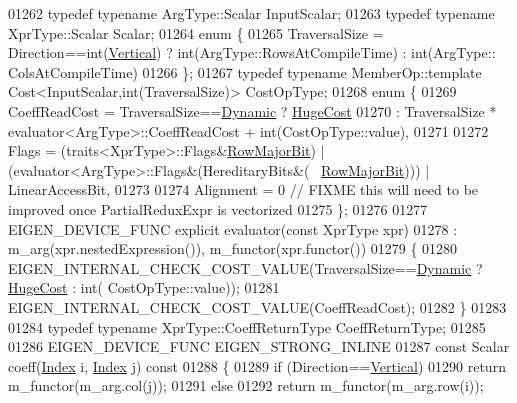 \begin{DoxyCode}
01262   \textcolor{keyword}{typedef} \textcolor{keyword}{typename} ArgType::Scalar InputScalar;
01263   \textcolor{keyword}{typedef} \textcolor{keyword}{typename} XprType::Scalar Scalar;
01264   \textcolor{keyword}{enum} \{
01265     TraversalSize = Direction==int(\hyperlink{group__enums_ggad49a7b3738e273eb00932271b36127f7addca718e0564723df21d61b94b1198be}{Vertical}) ? int(ArgType::RowsAtCompileTime) :  int(ArgType::
      ColsAtCompileTime)
01266   \};
01267   \textcolor{keyword}{typedef} \textcolor{keyword}{typename} MemberOp::template Cost<InputScalar,int(TraversalSize)> CostOpType;
01268   \textcolor{keyword}{enum} \{
01269     CoeffReadCost = TraversalSize==\hyperlink{namespace_eigen_ad81fa7195215a0ce30017dfac309f0b2}{Dynamic} ? \hyperlink{namespace_eigen_a3163430a1c13173faffde69016b48aaf}{HugeCost}
01270                   : TraversalSize * evaluator<ArgType>::CoeffReadCost + int(CostOpType::value),
01271     
01272     Flags = (traits<XprType>::Flags&\hyperlink{group__flags_gae4f56c2a60bbe4bd2e44c5b19cbe8762}{RowMajorBit}) | (evaluator<ArgType>::Flags&(HereditaryBits&(~
      \hyperlink{group__flags_gae4f56c2a60bbe4bd2e44c5b19cbe8762}{RowMajorBit}))) | LinearAccessBit,
01273     
01274     Alignment = 0 \textcolor{comment}{// FIXME this will need to be improved once PartialReduxExpr is vectorized}
01275   \};
01276 
01277   EIGEN\_DEVICE\_FUNC \textcolor{keyword}{explicit} evaluator(\textcolor{keyword}{const} XprType xpr)
01278     : m\_arg(xpr.nestedExpression()), m\_functor(xpr.functor())
01279   \{
01280     EIGEN\_INTERNAL\_CHECK\_COST\_VALUE(TraversalSize==\hyperlink{namespace_eigen_ad81fa7195215a0ce30017dfac309f0b2}{Dynamic} ? \hyperlink{namespace_eigen_a3163430a1c13173faffde69016b48aaf}{HugeCost} : \textcolor{keywordtype}{int}(
      CostOpType::value));
01281     EIGEN\_INTERNAL\_CHECK\_COST\_VALUE(CoeffReadCost);
01282   \}
01283 
01284   \textcolor{keyword}{typedef} \textcolor{keyword}{typename} XprType::CoeffReturnType CoeffReturnType;
01285 
01286   EIGEN\_DEVICE\_FUNC EIGEN\_STRONG\_INLINE
01287   \textcolor{keyword}{const} Scalar coeff(\hyperlink{namespace_eigen_a62e77e0933482dafde8fe197d9a2cfde}{Index} i, \hyperlink{namespace_eigen_a62e77e0933482dafde8fe197d9a2cfde}{Index} j)\textcolor{keyword}{ const}
01288 \textcolor{keyword}{  }\{
01289     \textcolor{keywordflow}{if} (Direction==\hyperlink{group__enums_ggad49a7b3738e273eb00932271b36127f7addca718e0564723df21d61b94b1198be}{Vertical})
01290       \textcolor{keywordflow}{return} m\_functor(m\_arg.col(j));
01291     \textcolor{keywordflow}{else}
01292       \textcolor{keywordflow}{return} m\_functor(m\_arg.row(i));

\end{DoxyCode}
